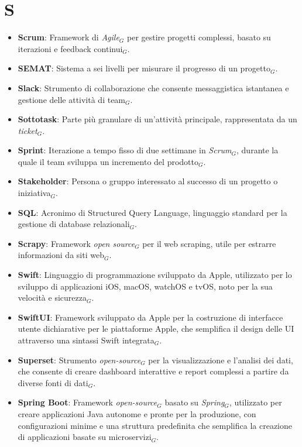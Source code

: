 \section{S}
\begin{itemize}
    \item \textbf{Scrum}: Framework di \textit{Agile}$_G$ per gestire progetti complessi, basato su iterazioni e feedback continui$_G$.
    \item \textbf{SEMAT}: Sistema a sei livelli per misurare il progresso di un progetto$_G$.
    \item \textbf{Slack}: Strumento di collaborazione che consente messaggistica istantanea e gestione delle attività di team$_G$.
    \item \textbf{Sottotask}: Parte più granulare di un’attività principale, rappresentata da un \textit{ticket}$_G$.
    \item \textbf{Sprint}: Iterazione a tempo fisso di due settimane in \textit{Scrum}$_G$, durante la quale il team sviluppa un incremento del prodotto$_G$.
    \item \textbf{Stakeholder}: Persona o gruppo interessato al successo di un progetto o iniziativa$_G$.
    \item \textbf{SQL}: Acronimo di Structured Query Language, linguaggio standard per la gestione di database relazionali$_G$.
    \item \textbf{Scrapy}: Framework \textit{open source}$_G$ per il web scraping, utile per estrarre informazioni da siti web$_G$.
    \item \textbf{Swift}: Linguaggio di programmazione sviluppato da Apple, utilizzato per lo sviluppo di applicazioni iOS, macOS, watchOS e tvOS, noto per la sua velocità e sicurezza$_G$.
    \item \textbf{SwiftUI}: Framework sviluppato da Apple per la costruzione di interfacce utente dichiarative per le piattaforme Apple, che semplifica il design delle UI attraverso una sintassi Swift integrata$_G$.
    \item \textbf{Superset}: Strumento \textit{open-source}$_G$ per la visualizzazione e l'analisi dei dati, che consente di creare dashboard interattive e report complessi a partire da diverse fonti di dati$_G$.
    \item \textbf{Spring Boot}: Framework \textit{open-source}$_G$ basato su \textit{Spring}$_G$, utilizzato per creare applicazioni Java autonome e pronte per la produzione, con configurazioni minime e una struttura predefinita che semplifica la creazione di applicazioni basate su microservizi$_G$.

\end{itemize}
